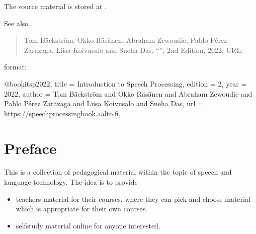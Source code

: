 \documentclass[letterpaper,10pt,english]{jupyterBook}
\begin{document}
\sphinxAtStartPar
The source material is stored at .

\sphinxAtStartPar
See also .

\begin{DUlineblock}{0em}
\item[] 
\end{DUlineblock}
\begin{quote}

\sphinxAtStartPar
Tom Bäckström, Okko Räsänen, Abraham Zewoudie, Pablo Pérez Zarazaga, Liisa Koivusalo and Sneha Das, “”, 2nd Edition, 2022. URL: 
\end{quote}

\sphinxAtStartPar
{} format:

\begin{sphinxVerbatim}[commandchars=\\\{\}]
@book\PYGZob{}itsp2022,
   title = \PYGZob{}Introduction to Speech Processing\PYGZcb{},
   edition = 2,
   year = 2022,
   author = \PYGZob{}Tom Bäckström and Okko Räsänen and Abraham Zewoudie and Pablo Pérez Zarazaga and Liisa Koivusalo and Sneha Das\PYGZcb{},
   url = \PYGZob{}https://speechprocessingbook.aalto.fi\PYGZcb{},
   \PYGZcb{}
\end{sphinxVerbatim}

\sphinxstepscope


\chapter{Preface}
\label{\detokenize{Preface:preface}}\label{\detokenize{Preface::doc}}
\sphinxAtStartPar
This is a collection of pedagogical material within the topic of speech
and language technology. The idea is to provide
\begin{itemize}
\item {} 
\sphinxAtStartPar
teachers material for their courses, where they can pick and choose
material which is appropriate for their own courses.

\item {} 
\sphinxAtStartPar
self\sphinxhyphen{}study material on\sphinxhyphen{}line for anyone interested.

\end{itemize}
\end{document}
